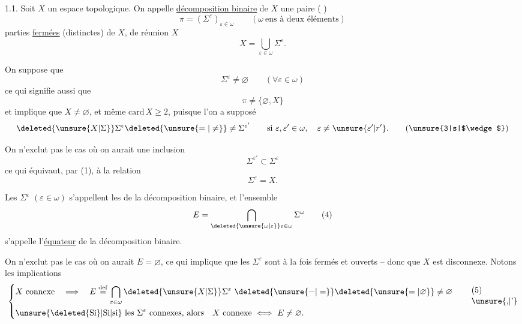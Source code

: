 1.1. Soit $X$ un espace topologique. On appelle \uline{décomposition binaire} de $X$ une paire ( )
\[
\pi=(\Sigma^\varepsilon)_{\varepsilon\in\omega}\qquad(\omega\ \text{ens à deux éléments})
\]
  parties \uline{fermées} (distinctes) de $X$, de réunion $X$
\[
X=\bigcup_{\varepsilon\in\omega}\Sigma^\varepsilon.\tag*{(1)}
\]

On suppose que
\[
\Sigma^\varepsilon\ne\varnothing\qquad(\forall\varepsilon\in\omega)\tag*{(2)}
\]
ce qui signifie aussi que
\[
\pi\ne\{\varnothing,X\}\tag*{$(2')$}
\]
et implique que $X\ne\varnothing$, et même $\mathrm{card}\,X\geq 2$, puisque l'on a supposé
\[
\deleted{\unsure{X|\Sigma}}\Sigma^\varepsilon\deleted{\unsure{=|\ne}}\ne\Sigma^{\varepsilon'}\qquad\text{si }\varepsilon,\varepsilon'\in\omega,\quad\varepsilon\ne\unsure{\varepsilon'|r'}.\tag*{(\unsure{3|s|$\wedge$})}
\]

On n'exclut pas le cas où on aurait une inclusion
\[
\Sigma^{\varepsilon'}\subset\Sigma^\varepsilon
\]
ce qui équivaut, par (1), à la relation
\[
\Sigma^\varepsilon=X.
\]

Les $\Sigma^\varepsilon$ $(\varepsilon\in\omega)$ s'appellent les \uline{} de la décomposition binaire,  et l'ensemble
\[
E=\bigcap_{\deleted{\unsure{\omega|\varepsilon}}\varepsilon\in\omega}\Sigma^\omega\tag*{(4)}
\]
s'appelle l'\uline{équateur} de la décomposition binaire.

On n'exclut pas le cas où on aurait $E=\varnothing$, ce qui implique que les $\Sigma^\varepsilon$ \inserted{$(\varepsilon\in\omega)$} sont  à la fois fermés et ouverts -- donc que $X$ est disconnexe.
\endgroup
{}
\begingroup
\makeatletter\tagsleft@true\makeatother
Notons les implications
\[
\left\{\begin{aligned}
&X\ \text{connexe}\quad\Longrightarrow\quad E\overset{\mathrm{def}}{=}\bigcap_{\varepsilon\in\omega}\deleted{\unsure{X|\Sigma}}\Sigma^\varepsilon\ \deleted{\unsure{-|=}}\deleted{\unsure{=|\varnothing}}\ne\varnothing\\
&\text{\unsure{\deleted{Si}|Si|si} les }\Sigma^\varepsilon\ \text{connexes, alors}\quad X\ \text{connexe}\ \Longleftrightarrow\ E\ne\varnothing.
\end{aligned}\right.\tag*{\shortstack[l]{(5)\\\unsure{,|'}}}
\]

